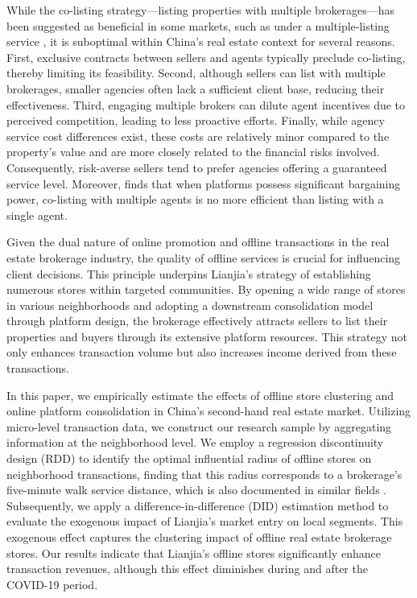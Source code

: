 \documentclass[11pt]{article}
\begin{document}
While the co-listing strategy—listing properties with multiple brokerages—has been suggested as beneficial in some markets, such as under a multiple-listing service \citep{RePEc:kap:jrefec:v:67:y:2023:i:3:d:10.1007_s11146-021-09858-w}, it is suboptimal within China's real estate context for several reasons. First, exclusive contracts between sellers and agents typically preclude co-listing, thereby limiting its feasibility. Second, although sellers can list with multiple brokerages, smaller agencies often lack a sufficient client base, reducing their effectiveness. Third, engaging multiple brokers can dilute agent incentives due to perceived competition, leading to less proactive efforts. Finally, while agency service cost differences exist, these costs are relatively minor compared to the property's value and are more closely related to the financial risks involved. Consequently, risk-averse sellers tend to prefer agencies offering a guaranteed service level. Moreover, \citet{bergemann_data_2024} finds that when platforms possess significant bargaining power, co-listing with multiple agents is no more efficient than listing with a single agent.

Given the dual nature of online promotion and offline transactions in the real estate brokerage industry, the quality of offline services is crucial for influencing client decisions. This principle underpins Lianjia's strategy of establishing numerous stores within targeted communities. By opening a wide range of stores in various neighborhoods and adopting a downstream consolidation model through platform design, the brokerage effectively attracts sellers to list their properties and buyers through its extensive platform resources. This strategy not only enhances transaction volume but also increases income derived from these transactions.

In this paper, we empirically estimate the effects of offline store clustering and online platform consolidation in China's second-hand real estate market. Utilizing micro-level transaction data, we construct our research sample by aggregating information at the neighborhood level. We employ a regression discontinuity design (RDD) to identify the optimal influential radius of offline stores on neighborhood transactions, finding that this radius corresponds to a brokerage's five-minute walk service distance, which is also documented in similar fields \citep{AZMI2012406}. Subsequently, we apply a difference-in-difference (DID) estimation method to evaluate the exogenous impact of Lianjia's market entry on local segments. This exogenous effect captures the clustering impact of offline real estate brokerage stores. Our results indicate that Lianjia's offline stores significantly enhance transaction revenues, although this effect diminishes during and after the COVID-19 period.
\end{document}
